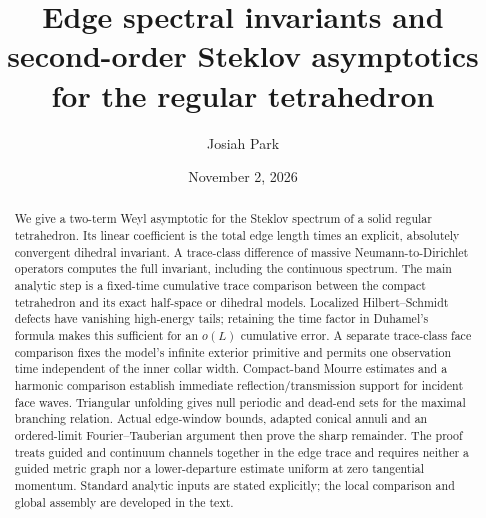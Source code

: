 \documentclass[11pt]{amsart}
\numberwithin{equation}{section}
\theoremstyle{remark}
\begin{document}
\title[Edge invariants and the tetrahedral Steklov problem]{Edge spectral invariants and second-order Steklov asymptotics for the regular tetrahedron}

\author{Josiah Park}

\date{November 2, 2026}



\begin{abstract}
We give a two-term Weyl asymptotic for the Steklov spectrum of a solid regular tetrahedron. Its linear coefficient is the total edge length times an explicit, absolutely convergent dihedral invariant. A trace-class difference of massive Neumann-to-Dirichlet operators computes the full invariant, including the continuous spectrum. The main analytic step is a fixed-time cumulative trace comparison between the compact tetrahedron and its exact half-space or dihedral models. Localized Hilbert--Schmidt defects have vanishing high-energy tails; retaining the time factor in Duhamel's formula makes this sufficient for an $o(L)$ cumulative error. A separate trace-class face comparison fixes the model's infinite exterior primitive and permits one observation time independent of the inner collar width. Compact-band Mourre estimates and a harmonic comparison establish immediate reflection/transmission support for incident face waves. Triangular unfolding gives null periodic and dead-end sets for the maximal branching relation. Actual edge-window bounds, adapted conical annuli and an ordered-limit Fourier--Tauberian argument then prove the sharp remainder. The proof treats guided and continuum channels together in the edge trace and requires neither a guided metric graph nor a lower-departure estimate uniform at zero tangential momentum. Standard analytic inputs are stated explicitly; the local comparison and global assembly are developed in the text.
\end{abstract}

\maketitle

\begin{center}
\end{center}
\end{document}
